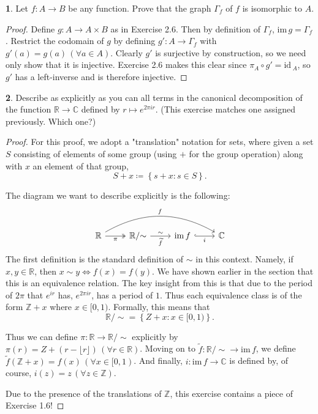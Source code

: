 \documentclass{article}
\newcounter{section-number}
\theoremstyle{definition}
\newtheorem{ex}{}[section-number]
\begin{document}
\begin{ex}
	Let $f: A \to B$ be any function.
	Prove that the graph $\Gamma_f$ of $f$ is isomorphic to $A$.
\end{ex}
\begin{proof}
	Define $g: A \to A \times B$ as in Exercise 2.6.
	Then by definition of $\Gamma_f$, $\mathrm{im}\,g = \Gamma_f$.
	Restrict the codomain of $g$ by defining $g': A \to \Gamma_f$ with $g'(a) = g(a)\,(\forall a \in A)$.
	Clearly $g'$ is surjective by construction, so we need only show that it is injective.
	Exercise 2.6 makes this clear since $\pi_A \circ g' = \mathrm{id}\,_A$, so $g'$ has a left-inverse and is therefore injective.
\end{proof}

\begin{ex}
	Describe as explicitly as you can all terms in the canonical decomposition of the function $\mathbb{R} \to \mathbb{C}$ defined by $r \mapsto e^{2\pi i r}$.
	(This exercise matches one assigned previously. Which one?)
\end{ex}
\begin{proof}
	For this proof, we adopt a "translation" notation for sets, where given a set $S$ consisting of elements of some group (using $+$ for the group operation) along with $x$ an element of that group, \begin{equation*}
		S + x \coloneq \left\lbrace s + x : s \in S \right\rbrace.
	\end{equation*}

	The diagram we want to describe explicitly is the following: \begin{equation*}
		\begin{tikzcd}
			\mathbb{R} \arrow[rrr, bend left, "f"] \arrow[r, twoheadrightarrow, "\pi"'] & \mathbb{R}/{\sim} \arrow[r, "\sim", "\widetilde{f}"'] & \mathrm{im}\,f \arrow[r, hook, "i"'] & \mathbb{C}
		\end{tikzcd}
	\end{equation*}
	The first definition is the standard definition of $\sim$ in this context.
	Namely, if $x, y \in \mathbb{R}$, then $x \sim y \iff f(x) = f(y)$.
	We have shown earlier in the section that this is an equivalence relation.
	The key insight from this is that due to the period of $2\pi$ that $e^{ir}$ has, $e^{2\pi i r}$, has a period of $1$.
	Thus each equivalence class is of the form $\mathbb{Z} + x$ where $x \in [0, 1)$.
	Formally, this means that \begin{equation*}
		\mathbb{R}/{\sim} = \left\lbrace Z + x : x \in [0, 1) \right\rbrace.
	\end{equation*}

	Thus we can define $\pi: \mathbb{R} \to \mathbb{R}/{\sim}$ explicitly by $\pi(r) = Z + (r - \lfloor r \rfloor)\,(\forall r \in \mathbb{R})$.
	Moving on to $\widetilde{f}: \mathbb{R}/{\sim} \to \mathrm{im}\,f$, we define $\widetilde{f}(\mathbb{Z} + x) = f(x)\,(\forall x \in [0, 1)$.
	And finally, $i: \mathrm{im}\,f \to \mathbb{C}$ is defined by, of course, $i(z) = z\,(\forall z \in \mathbb{Z})$.

	Due to the presence of the translations of $\mathbb{Z}$, this exercise contains a piece of Exercise 1.6!
\end{proof}
\end{document}
